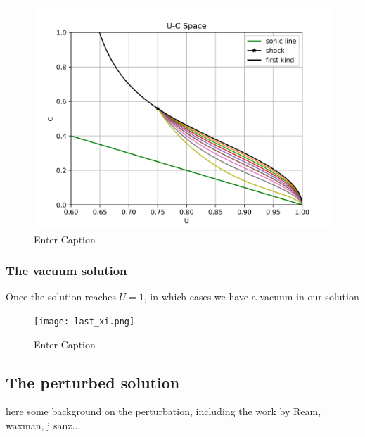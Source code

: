 \documentclass{article}
\begin{document}
\begin{figure}
    \centering
    \includegraphics[width=1\linewidth]{3rd_type_solutions.png}
    \caption{Enter Caption}
    \label{fig:enter-label}
\end{figure}


\subsubsection{The vacuum solution}
Once the solution reaches $U=1$, 
in which cases we have a vacuum in our solution
\begin{figure}
    \centering
    \texttt{[image: last\_xi.png]}
    \caption{Enter Caption}
    \label{fig:enter-label}
\end{figure}


\subsection{The perturbed solution}
here some background on the perturbation, including the work by Ream, waxman, j sanz...
\end{document}

